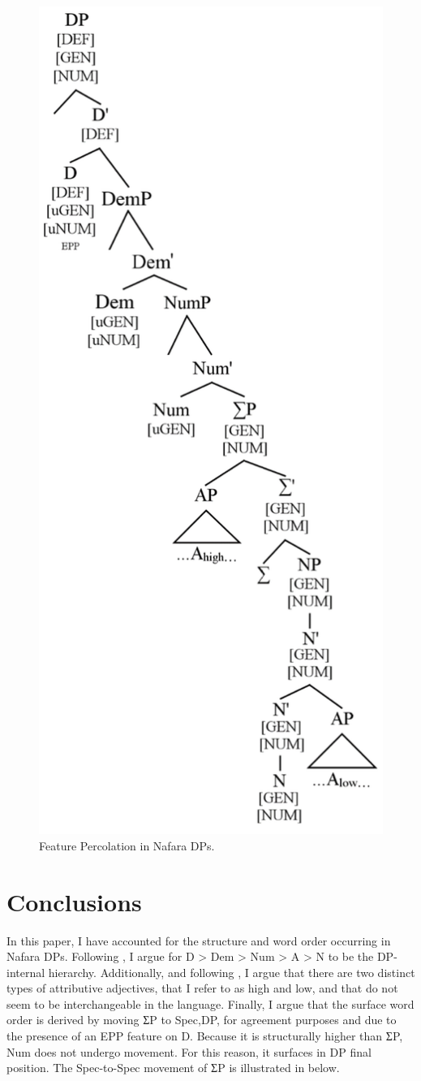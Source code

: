 \documentclass[output=paper]{langscibook}
\begin{document}
  
\begin{figure}
\includegraphics[width=.7\textwidth]{figures/baron-img4.png}
\caption{Feature Percolation in Nafara DPs.}
\label{fig:baron:4}
\end{figure}


\section{Conclusions}
\label{sec:baron:3}
In this paper, I have accounted for the structure and word order occurring in Nafara DPs. Following \citet{Cinque2005}, I argue for D > Dem > Num > A > N to be the DP-internal hierarchy. Additionally, and following \citet{Cinque2010}, I argue that there are two distinct types of attributive adjectives, that I refer to as high and low, and that do not seem to be interchangeable in the language. Finally, I argue that the surface word order is derived by moving ƩP to Spec,DP, for agreement purposes and due to the presence of an EPP feature on D. Because it is structurally higher than ƩP, Num does not undergo movement. For this reason, it surfaces in DP final position. The Spec-to-Spec movement of ƩP is illustrated in  below.
\end{document}
